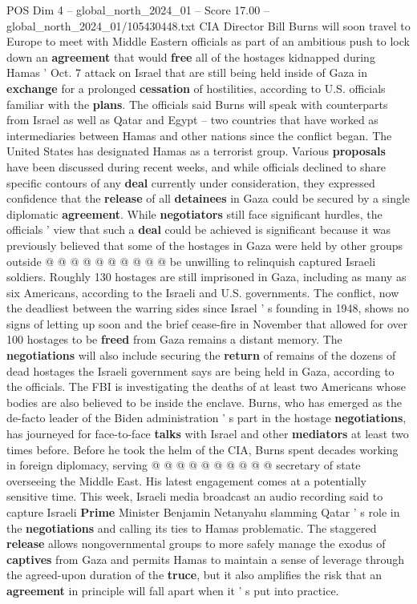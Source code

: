 \begin{textsample}{POS Dim 4 – global\_north\_2024\_01 – Score 17.00 – global\_north\_2024\_01/105430448.txt}  \label{ex:f4_pos_340}
CIA Director Bill Burns will soon travel to Europe to meet with Middle Eastern officials as part of an ambitious push to lock down an \textbf{agreement} that would \textbf{free} all of the hostages kidnapped during Hamas ' Oct. 7 attack on Israel that are still being held inside of Gaza in \textbf{exchange} for a prolonged \textbf{cessation} of hostilities, according to U.S. officials familiar with the \textbf{plans}.
The officials said Burns will speak with counterparts from Israel as well as Qatar and Egypt -- two countries that have worked as intermediaries between Hamas and other nations since the conflict began.
The United States has designated Hamas as a terrorist group.
Various \textbf{proposals} have been discussed during recent weeks, and while officials declined to share specific contours of any \textbf{deal} currently under consideration, they expressed confidence that the \textbf{release} of all \textbf{detainees} in Gaza could be secured by a single diplomatic \textbf{agreement}.
While \textbf{negotiators} still face significant hurdles, the officials ' view that such a \textbf{deal} could be achieved is significant because it was previously believed that some of the hostages in Gaza were held by other groups outside @ @ @ @ @ @ @ @ @ @ be unwilling to relinquish captured Israeli soldiers.
Roughly 130 hostages are still imprisoned in Gaza, including as many as six Americans, according to the Israeli and U.S. governments.
The conflict, now the deadliest between the warring sides since Israel ' s founding in 1948, shows no signs of letting up soon and the brief cease-fire in November that allowed for over 100 hostages to be \textbf{freed} from Gaza remains a distant memory.
The \textbf{negotiations} will also include securing the \textbf{return} of remains of the dozens of dead hostages the Israeli government says are being held in Gaza, according to the officials.
The FBI is investigating the deaths of at least two Americans whose bodies are also believed to be inside the enclave.
Burns, who has emerged as the de-facto leader of the Biden administration ' s part in the hostage \textbf{negotiations}, has journeyed for face-to-face \textbf{talks} with Israel and other \textbf{mediators} at least two times before.
Before he took the helm of the CIA, Burns spent decades working in foreign diplomacy, serving @ @ @ @ @ @ @ @ @ @ secretary of state overseeing the Middle East.
His latest engagement comes at a potentially sensitive time.
This week, Israeli media broadcast an audio recording said to capture Israeli \textbf{Prime} Minister Benjamin Netanyahu slamming Qatar ' s role in the \textbf{negotiations} and calling its ties to Hamas problematic.
The staggered \textbf{release} allows nongovernmental groups to more safely manage the exodus of \textbf{captives} from Gaza and permits Hamas to maintain a sense of leverage through the agreed-upon duration of the \textbf{truce}, but it also amplifies the risk that an \textbf{agreement} in principle will fall apart when it ' s put into practice.

\end{textsample}
